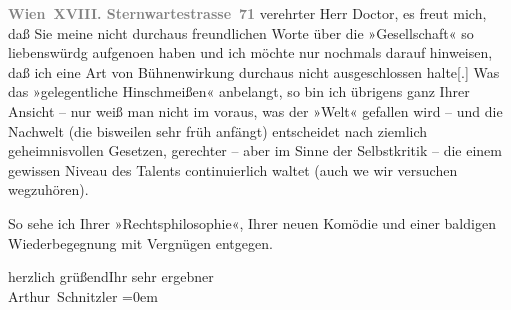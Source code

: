 \pstart
           \textcolor{gray}{\textbf{Wien XVIII. Sternwartestrasse 71}}\pend
           \vspace{0.5em}
\pstart
           verehrter Herr Doctor, es freut mich, daß Sie meine nicht durchaus
               freundlichen Worte über die »Gesellschaft« so
               liebenswürdg aufgeno{\geminationm}en haben und ich möchte nur
               nochmals darauf hinweisen, daß ich eine Art von Bühnenwirkung durchaus nicht
               ausgeschlossen halte{[}.{]} Was das »gelegentliche Hinschmeißen«
               anbelangt, so bin ich übrigens ganz Ihrer Ansicht – nur weiß man nicht im voraus, was
               der »Welt« gefallen wird – und die Nachwelt (die bisweilen sehr früh anfängt) ent{\pb}scheidet nach ziemlich geheimnisvollen Gesetzen, gerechter
               – aber im Sinne der Selbstkritik – die einem gewissen Niveau des Talents
               continuierlich waltet (auch we{\geminationn} wir versuchen
               wegzuhören).\pend
           
\pstart
           So sehe ich Ihrer »Rechtsphilosophie«, Ihrer
               neuen Komödie und einer baldigen Wiederbegegnung mit Vergnügen entgegen.\pend
           
\pstart
           herzlich grüßend\hspace*{1.5em}Ihr sehr ergebner{\\[\baselineskip]}\spacefill\mbox{Arthur Schnitzler}\pend
           \leftskip=0em{}\endnumbering{}  \newcommand{\dateiname}{L02216}\newcommand{\titel}{Arthur Schnitzler an Robert Adam, 20. 7. 1915}\newcommand{\editorInnen}{Martin Anton Müller und Gerd-Hermann Susen}
